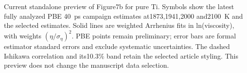 \caption{Current standalone preview of Figure7b for pure Ti. Symbols show the latest fully analyzed PBE 40~ps campaign estimates at1873,1941,2000 and2100~K and the selected \rscan{} estimates. Solid lines are weighted Arrhenius fits in ln(viscosity), with weights $(\eta/\sigma_\eta)^2$. PBE points remain preliminary; error bars are formal estimator standard errors and exclude systematic uncertainties. The dashed Ishikawa correlation and its10.3\% band retain the selected article styling. This preview does not change the manuscript data selection.}
